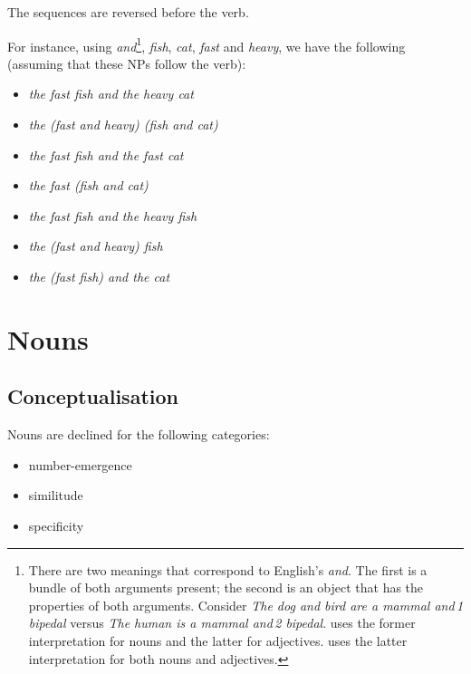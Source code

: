 \documentclass{book}
\begin{document}
The sequences are reversed before the verb.

For instance, using  \emph{and}\footnote{There are two meanings that correspond to English's \emph{and}. The first is a bundle of both arguments present; the second is an object that has the properties of both arguments. Consider \emph{The dog and bird are a mammal and\,1 bipedal} versus \emph{The human is a mammal and\,2 bipedal}.  uses the former interpretation for nouns and the latter for adjectives.  uses the latter interpretation for both nouns and adjectives.},  \emph{fish},  \emph{cat},  \emph{fast} and  \emph{heavy}, we have the following (assuming that these NPs follow the verb):

\begin{itemize}
  \item {} \emph{the fast fish and the heavy cat}
  \item {} \emph{the (fast and heavy) (fish and cat)}
  \item {} \emph{the fast fish and the fast cat}
  \item {} \emph{the fast (fish and cat)}
  \item {} \emph{the fast fish and the heavy fish}
  \item {} \emph{the (fast and heavy) fish}
  \item {} \emph{the (fast fish) and the cat}
\end{itemize}

\chapter{Nouns}

\section{Conceptualisation}

Nouns are declined for the following categories:

\begin{itemize}
  \item number-emergence
  \item similitude
  \item specificity
\end{itemize}
\end{document}
